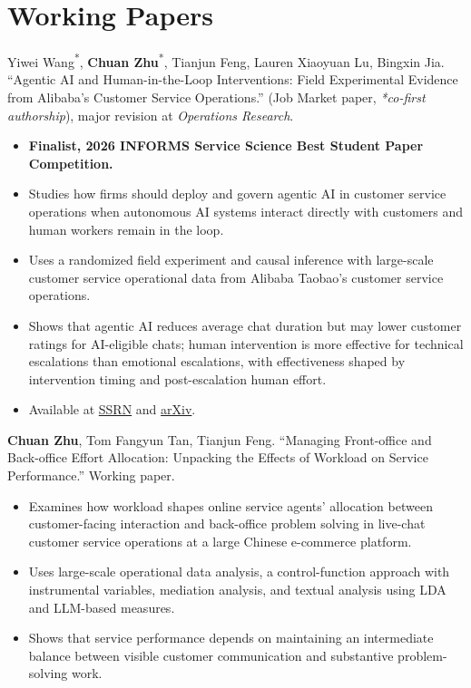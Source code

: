 \section*{Working Papers}

\begin{enumerate}[leftmargin=1.5em, label={[\arabic*]}, itemsep=5pt]
  \item Yiwei Wang\textsuperscript{*}, \textbf{Chuan Zhu}\textsuperscript{*}, Tianjun Feng, Lauren Xiaoyuan Lu, Bingxin Jia. ``Agentic AI and Human-in-the-Loop Interventions: Field Experimental Evidence from Alibaba's Customer Service Operations.'' (Job Market paper, \textit{*co-first authorship}), major revision at \textit{Operations Research}.
  \begin{itemize}[leftmargin=1.2em]
    \cvitemsep
    \item \textbf{Finalist, 2026 INFORMS Service Science Best Student Paper Competition.}
    \item Studies how firms should deploy and govern agentic AI in customer service operations when autonomous AI systems interact directly with customers and human workers remain in the loop.
    \item Uses a randomized field experiment and causal inference with large-scale customer service operational data from Alibaba Taobao's customer service operations.
    \item Shows that agentic AI reduces average chat duration but may lower customer ratings for AI-eligible chats; human intervention is more effective for technical escalations than emotional escalations, with effectiveness shaped by intervention timing and post-escalation human effort.
    \item Available at \href{https://papers.ssrn.com/sol3/cf_dev/AbsByAuth.cfm?per_id=11527448}{SSRN} and \href{https://arxiv.org/abs/2605.14830}{arXiv}.
  \end{itemize}

  \item \textbf{Chuan Zhu}, Tom Fangyun Tan, Tianjun Feng. ``Managing Front-office and Back-office Effort Allocation: Unpacking the Effects of Workload on Service Performance.'' Working paper.
  \begin{itemize}[leftmargin=1.2em]
    \cvitemsep
    \item Examines how workload shapes online service agents' allocation between customer-facing interaction and back-office problem solving in live-chat customer service operations at a large Chinese e-commerce platform.
    \item Uses large-scale operational data analysis, a control-function approach with instrumental variables, mediation analysis, and textual analysis using LDA and LLM-based measures.
    \item Shows that service performance depends on maintaining an intermediate balance between visible customer communication and substantive problem-solving work.
  \end{itemize}
\end{enumerate}

